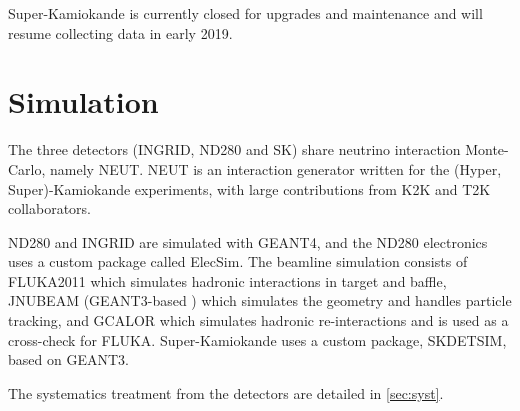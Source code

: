 Super-Kamiokande is currently closed for upgrades and maintenance and will resume collecting data in early 2019\cite{superk_upgrade}.

\section{Simulation}
The three detectors (INGRID, ND280 and SK) share neutrino interaction Monte-Carlo, namely NEUT\cite{neut}. NEUT is an interaction generator written for the (Hyper, Super)-Kamiokande experiments, with large contributions from K2K and T2K collaborators.

ND280 and INGRID are simulated with GEANT4\cite{t2k_det,geant4}, and the ND280 electronics uses a custom package called ElecSim. The beamline simulation consists of FLUKA2011 \cite{fluka2008_1, fluka2008_2, fluka2011} which simulates hadronic interactions in target and baffle, JNUBEAM (GEANT3-based \cite{geant3}) which simulates the geometry and handles particle tracking, and GCALOR \cite{gcalor} which simulates hadronic re-interactions and is used as a cross-check for FLUKA\cite{t2k_beam, t2k_tn_flux}. Super-Kamiokande uses a custom package, SKDETSIM\cite{t2k_sk}, based on GEANT3\cite{geant3}.

The systematics treatment from the detectors are detailed in \autoref{sec:syst}.

